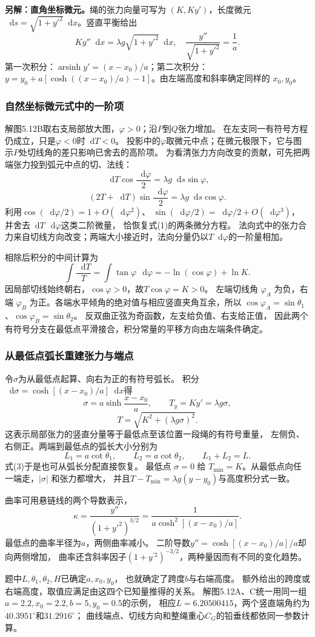 \documentclass[UTF8,fontset=fandol,a4paper,11pt]{ctexart}
\newcommand{\dd}{\mathop{}\!\mathrm{d}}
\begin{document}
\textbf{另解：直角坐标微元。}绳的张力向量可写为 $(K,Ky')$，长度微元 $\dd s=\sqrt{1+y'^2}\dd x$。竖直平衡给出
\[
 K y''\dd x=\lambda g\sqrt{1+y'^2}\dd x,
 \quad \frac{y''}{\sqrt{1+y'^2}}=\frac1a.
\]
第一次积分：$\operatorname{arsinh}y'=(x-x_0)/a$；第二次积分：$y=y_0+a[\cosh((x-x_0)/a)-1]$。由左端高度和斜率确定同样的 $x_0,y_0$。
\subsubsection*{自然坐标微元式中的一阶项}
解图5.12B取右支局部放大图，$\varphi>0$；沿$P$到$Q$张力增加。
在左支同一有符号方程仍成立，只是$\varphi<0$时$\dd T<0$。
投影中的$\varphi$取微元中点；在微元极限下，它与图示$P$处切线角的差只影响已舍去的高阶项。
为看清张力方向改变的贡献，可先把两端张力投到弧元中点的切、法线：
\[
\dd T\cos\frac{\dd\varphi}{2}
=\lambda g\dd s\sin\varphi,
\]
\[
(2T+\dd T)\sin\frac{\dd\varphi}{2}
=\lambda g\dd s\cos\varphi.
\]
利用$\cos(\dd\varphi/2)=1+O(\dd\varphi^2)$、
$\sin(\dd\varphi/2)=\dd\varphi/2+O(\dd\varphi^3)$，
并舍去$\dd T\,\dd\varphi$这类二阶微量，
恰恢复式(1)的两条微分方程。
法向式中的张力合力来自切线方向改变；两端大小接近时，法向分量仍以$T\dd\varphi$的一阶量相加。

相除后积分的中间计算为
\[
\int\frac{\dd T}{T}
=\int\tan\varphi\,\dd\varphi
=-\ln(\cos\varphi)+\ln K.
\]
因局部切线始终朝右，$\cos\varphi>0$，故$T\cos\varphi=K>0$。
左端切线角 $\varphi_A$ 为负，右端 $\varphi_B$ 为正。各端水平倾角的绝对值与相应竖直夹角互余，所以 $\cos\varphi_A=\sin\theta_1$、$\cos\varphi_B=\sin\theta_2$。
反双曲正弦为奇函数，左支给负值、右支给正值，
因此两个有符号分支在最低点平滑接合，积分常量的平移方向由左端条件确定。

\subsubsection*{从最低点弧长重建张力与端点}
令$\sigma$为从最低点起算、向右为正的有符号弧长。
积分$\dd\sigma=\cosh[(x-x_0)/a]\dd x$得
\[
\sigma=a\sinh\frac{x-x_0}{a},\qquad
T_y=Ky'=\lambda g\sigma,
\]
\[
T=\sqrt{K^2+(\lambda g\sigma)^2}.
\]
这表示局部张力的竖直分量等于最低点至该位置一段绳的有符号重量，
左侧负、右侧正。两端到最低点的弧长大小分别为
\[
L_1=a\cot\theta_1,\qquad L_2=a\cot\theta_2,\qquad
L_1+L_2=L.
\]
式(3)于是也可从弧长分配直接恢复。
最低点 $\sigma=0$ 给 $T_{\min}=K$。从最低点向任一端走，$|\sigma|$ 和张力都增大，
并且$T-T_{\min}=\lambda g(y-y_0)$与高度积分式一致。

曲率可用悬链线的两个导数表示，
\[
\kappa=\frac{y''}{(1+y'^2)^{3/2}}
=\frac1{a\cosh^2[(x-x_0)/a]}.
\]
最低点的曲率半径为$a$，两侧曲率减小。
二阶导数$y''=\cosh[(x-x_0)/a]/a$却向两侧增加，
曲率还含斜率因子$(1+y^{\prime2})^{-3/2}$，两种量因而有不同的变化趋势。

题中$L,\theta_1,\theta_2,H$已确定$a,x_0,y_0$，
也就确定了跨度$b$与右端高度。
额外给出的跨度或右端高度，取值应满足由这四个已知量推得的关系。
解图5.12A、C统一用同一组$a=2.2,x_0=2.2,b=5,y_0=0.5$的示例，
相应$L=6.20500415$，两个竖直端角约为$40.3951^\circ$和$31.2916^\circ$；
曲线端点、切线方向和整绳重心$C_G$的铅垂线都依同一参数计算。
\end{document}
